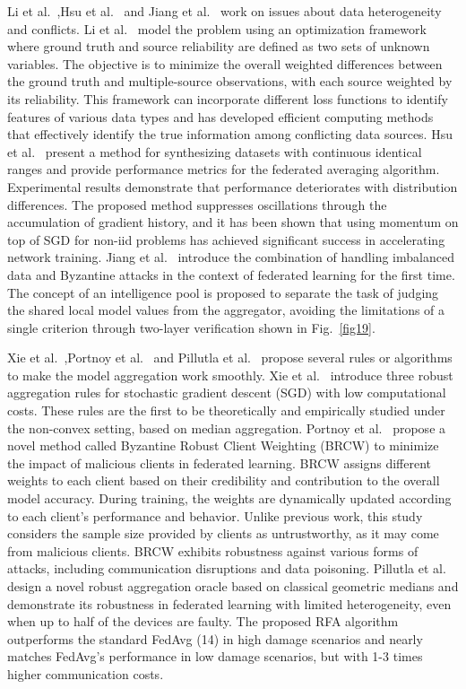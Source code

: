 \documentclass[pdflatex,sn-mathphys-num]{sn-jnl}%
\theoremstyle{thmstyleone}%
\theoremstyle{thmstyletwo}%
\theoremstyle{thmstylethree}%
\begin{document}
Li et al.~\cite{li2014resolving},Hsu et al.~\cite{hsu2019measuring} and Jiang et al.~\cite{jiang2023secure}
work on issues about data heterogeneity and conflicts.
Li et al.~\cite{li2014resolving} model the problem using an optimization
framework where ground truth and source reliability are
defined as two sets of unknown variables. The objective
is to minimize the overall weighted differences between
the ground truth and multiple-source observations, with
each source weighted by its reliability. This framework
can incorporate different loss functions to identify
features of various data types and has developed eﬀicient
computing methods that effectively identify the true
information among conflicting data sources. Hsu et al.~\cite{hsu2019measuring}
present a method for synthesizing datasets with
continuous identical ranges and provide performance
metrics for the federated averaging algorithm. Experimental
results demonstrate that performance deteriorates with
distribution differences. The proposed method suppresses
oscillations through the accumulation of gradient history,
and it has been shown that using momentum on top
of SGD for non-iid problems has achieved significant
success in accelerating network training. Jiang et al.~\cite{jiang2023secure}
introduce the combination of handling imbalanced data
and Byzantine attacks in the context of federated learning
for the first time. The concept of an intelligence pool is
proposed to separate the task of judging the shared local
model values from the aggregator, avoiding the limitations
of a single criterion through two-layer verification shown
in Fig.~\ref{fig19}.

Xie et al.~\cite{xie2018generalized},Portnoy et al.~\cite{portnoy2020towards} and Pillutla et
al.~\cite{pillutla2022robust} propose several rules or algorithms to make
the model aggregation work smoothly. Xie et al.~\cite{xie2018generalized}
introduce three robust aggregation rules for stochastic
gradient descent (SGD) with low computational costs.
These rules are the first to be theoretically and empirically
studied under the non-convex setting, based on median
aggregation. Portnoy et al.~\cite{portnoy2020towards} propose a novel method
called Byzantine Robust Client Weighting (BRCW) to
minimize the impact of malicious clients in federated
learning. BRCW assigns different weights to each client
based on their credibility and contribution to the overall
model accuracy. During training, the weights are
dynamically updated according to each client's performance
and behavior. Unlike previous work, this study considers
the sample size provided by clients as untrustworthy,
as it may come from malicious clients. BRCW exhibits
robustness against various forms of attacks, including
communication disruptions and data poisoning. Pillutla
et al.~\cite{pillutla2022robust} design a novel robust aggregation oracle based
on classical geometric medians and demonstrate its
robustness in federated learning with limited heterogeneity, even
when up to half of the devices are faulty. The proposed
RFA algorithm outperforms the standard FedAvg (14)
in high damage scenarios and nearly matches FedAvg's
performance in low damage scenarios, but with 1-3 times
higher communication costs.
\end{document}
